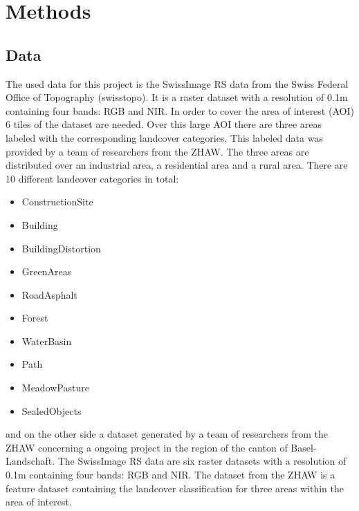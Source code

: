 

\section{Methods}
\label{methods}

\subsection{Data}%

The used data for this project is the SwissImage RS data from the Swiss Federal Office of Topography (swisstopo).
It is a raster dataset with a resolution of 0.1m containing four bands: RGB and NIR.
In order to cover the area of interest (AOI) 6 tiles of the dataset are needed.
Over this large AOI there are three areas labeled with the corresponding landcover categories.
This labeled data was provided by a team of researchers from the ZHAW. The three
areas are distributed over an industrial area, a residential area and a rural area.
There are 10 different landcover categories in total:
\begin{itemize}
    \item ConstructionSite
    \item Building
    \item BuildingDistortion
    \item GreenAreas
    \item RoadAsphalt
    \item Forest
    \item WaterBasin
    \item Path
    \item MeadowPasture
    \item SealedObjects
\end{itemize}








and on the other side a dataset generated by a team of researchers from the ZHAW concerning a ongoing project in the region of
the canton of Basel-Landschaft. The SwissImage RS data are six raster datasets with a resolution of 0.1m containing four bands: 
RGB and NIR. The dataset from the ZHAW is a feature dataset containing the landcover classification for three areas within 
the area of interest. 

